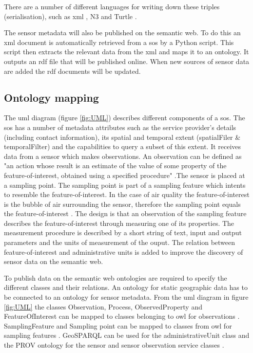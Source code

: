 There are a number of different languages for writing down these triples (serialisation), such as \ac{xml} \citep{LD:W3C3}, N3 \citep{LD:W3C5} and Turtle \citep{LD:W3C4}. 

The sensor metadata will also be published on the semantic web. To do this an \ac{xml} document is automatically retrieved from a \ac{sos} by a Python script. This script then extracts the relevant data from the \ac{xml} and maps it to an ontology. It outputs an \ac{rdf} file that will be published online. When new sources of sensor data are added the \ac{rdf} documents will be updated.   

\subsection{Ontology mapping}
The \ac{uml} diagram (figure \ref{fig:UML}) describes different components of a \ac{sos}. The \ac{sos} has a number of metadata attributes such as the service provider's details (including contact information), its spatial and temporal extent (spatialFiler \& temporalFilter) and the capabilities to query a subset of this extent. It receives data from a sensor which makes observations. An observation can be defined as "an action whose result is an estimate of the value of some property of the feature-of-interest, obtained using a specified procedure" \citep{SSW:Cox3}.The sensor is placed at a sampling point. The sampling point is part of a sampling feature which intents to resemble the feature-of-interest. In the case of air quality the feature-of-interest is the bubble of air surrounding the sensor, therefore the sampling point equals the feature-of-interest \citep{SDI:INSPIRE2}. The design is that an observation of the sampling feature describes the  feature-of-interest through measuring one of its properties. The measurement procedure is described by a short string of text, input and output parameters and the units of measurement of the ouput. The relation between feature-of-interest and administrative units is added to improve the discovery of sensor data on the semantic web. 

To publish data on the semantic web ontologies are required to specify the different classes and their relations. An ontology for static geographic data has to be connected to an ontology for sensor metadata. From the \ac{uml} diagram in figure \ref{fig:UML} the classes Observation, Process, ObservedProperty and FeatureOfInterest can be mapped to classes belonging to \ac{owl} for observations \citep{SSW:Cox}. SamplingFeature and Sampling point can be mapped to classes from \ac{owl} for sampling features \cite{SSW:Cox2}. GeoSPARQL can be used for the administrativeUnit class \citep{LD:OGC} and the PROV ontology for the sensor and sensor observation service classes \citep{LD:W3C2}. 

